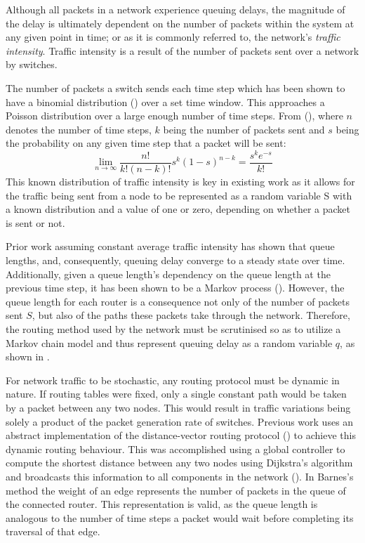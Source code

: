 Although all packets in a network experience queuing delays, the magnitude of the delay is ultimately dependent on the number of packets within the system at any given point in time; or as it is commonly referred to, the network's \textit{traffic intensity}. Traffic intensity is a result of the number of packets sent over a network by switches.\par
The number of packets a switch sends each time step which has been shown to have a binomial distribution (\cite{barnes_stochastic_2020}) over a set time window. This approaches a Poisson distribution over a large enough number of time steps. From (\cite{barnes_stochastic_2020}), where $n$ denotes the number of time steps, $k$ being the number of packets sent and $s$ being the probability on any given time step that a packet will be sent:
\[\lim_{n\to\infty} \frac{n!}{k!(n-k)!}s^k (1-s)^{n-k} =\frac{s^k e^{-s}}{k!}\]
This known distribution of traffic intensity is key in existing work as it allows for the traffic being sent from a node to be represented as a random variable S with a known distribution and a value of one or zero, depending on whether a packet is sent or not.\par
Prior work assuming constant average traffic intensity has shown that queue lengths, and, consequently, queuing delay converge to a steady state over time. Additionally, given a queue length's dependency on the queue length at the previous time step, it has been shown to be a Markov process (\cite{barnes_stochastic_2020}). However, the queue length for each router is a consequence not only of the number of packets sent $S$, but also of the paths these packets take through the network. Therefore, the routing method used by the network must be scrutinised so as to utilize a Markov chain model and thus represent queuing delay as a random variable $q$, as shown in \cite{barnes_stochastic_2020}.\par
For network traffic to be stochastic, any routing protocol must be dynamic in nature. If routing tables were fixed, only a single constant path would be taken by a packet between any two nodes. This would result in traffic variations being solely a product of the packet generation rate of switches. Previous work uses an abstract implementation of the distance-vector routing protocol (\cite{perkins_ad_2003}) to achieve this dynamic routing behaviour. This was accomplished using a global controller to compute the shortest distance between any two nodes using Dijkstra's algorithm and broadcasts this information to all components in the network (\cite{barnes_stochastic_2020}). In Barnes's method the weight of an edge represents the number of packets in the queue of the connected router. This representation is valid, as the queue length is analogous to the number of time steps a packet would wait before completing its traversal of that edge.\par
